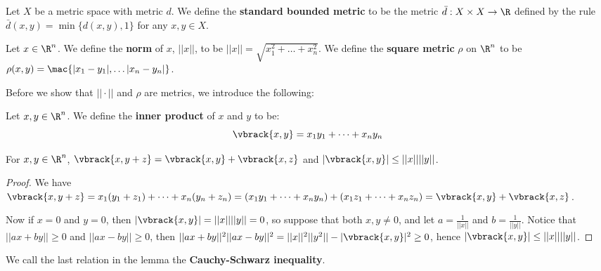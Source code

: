 \begin{definition}
    Let $X$ be a metric space with metric  $d$. We define the \textbf{standard
    bounded metric} to be the metric $\bar{d}:X \times X \rightarrow \R$ defined
    by the rule $\bar{d}(x,y) = \min\{d(x,y), 1\}$ for any $x,y \in X$.
\end{definition}

\begin{definition}
    Let $x \in \R^n$. We define the \textbf {norm} of $x$,  $||x||$, to be
    $||x||=\sqrt{x_1^2+ \dots +x_n^2}$. We define the \textbf{square metric} $\rho$  on
    $\R^n$ to be  $\rho(x,y)=\mac\{|x_1-y_1|, \dots |x_n-y_n|\}$.
\end{definition}

Before we show that $||\cdot||$ and  $\rho$ are metrics, we introduce the following:

 \begin{definition}
    Let $x,y \in \R^n$. We define the \textbf{inner product} of $x$ and $y$ to be:
        \begin{equation}
            \vbrack{x,y}=x_1y_1+ \dots +x_ny_n
        \end{equation}
\end{definition}

\begin{lemma}\label{2.2.5}
    For $x,y \in \R^n$,  $\vbrack{x,y+z}=\vbrack{x,y}+\vbrack{x,z}$ and $|\vbrack{x,y}| \leq
    ||x||||y||$.
\end{lemma}
\begin{proof}
    We have $\vbrack{x,y+z}=x_1(y_1+z_1)+ \dots +x_n(y_n+z_n)=(x_1y_1 + \dots
    +x_ny_n)+(x_1z_1+ \dots +x_nz_n)=\vbrack{x,y}+\vbrack{x,z}$.

    Now if $x=0$ and  $y=0$, then  $|\vbrack{x,y}|=||x||||y||=0$, so suppose that both $x,y \neq 0$,
    and let  $a=\frac{1}{||x||}$ and $b=\frac{1}{||y||}$. Notice that $||ax+by|| \geq 0$ and
    $||ax-by|| \geq 0$, then $||ax+by||^2||ax-by||^2=||x||^2||y^2||-|\vbrack{x,y}|^2\geq 0$, hence
    $|\vbrack{x,y}| \leq ||x||||y||$.
\end{proof}
\begin{remark}
    We call the last relation in the lemma the \textbf{Cauchy-Schwarz inequality}.
\end{remark}

